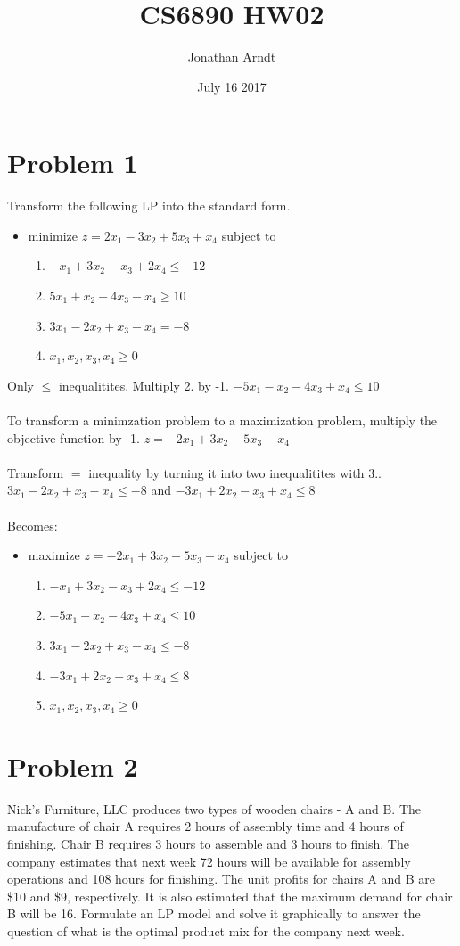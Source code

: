 \documentclass[11pt,a4paper,openany]{report}
\title{CS6890 HW02}
\author{Jonathan Arndt }
\date{July 16 2017}
\begin{document}
\maketitle

\section*{Problem 1}
Transform the following LP into the standard form.

\begin{itemize}
  \item minimize \(z=2x_1-3x_2+5x_3+x_4\) subject to
  \begin{enumerate}
    \item \(-x_1+3x_2-x_3+2x_4\leq-12\)
    \item \(5x_1+x_2+4x_3-x_4\geq10\)
    \item \(3x_1-2x_2+x_3-x_4=-8\)
    \item \(x_1,x_2,x_3,x_4\geq0\)
  \end{enumerate}
\end{itemize}
Only \(\leq\) inequalitites. Multiply 2. by -1. \(-5x_1-x_2-4x_3+x_4\leq10\)\\\\
To transform a minimzation problem to a maximization problem, multiply the objective function by -1. \(z=-2x_1+3x_2-5x_3-x_4\) \\\\
Transform \(=\) inequality by turning it into two inequalitites with 3..\\  \(3x_1-2x_2+x_3-x_4\leq-8\) and \(-3x_1+2x_2-x_3+x_4\leq8\)\\\\
Becomes:
\begin{itemize}
  \item maximize \(z=-2x_1+3x_2-5x_3-x_4\) subject to
  \begin{enumerate}
    \item \(-x_1+3x_2-x_3+2x_4\leq-12\)
    \item \(-5x_1-x_2-4x_3+x_4\leq10\)
    \item \(3x_1-2x_2+x_3-x_4\leq-8\)
    \item \(-3x_1+2x_2-x_3+x_4\leq8\)
    \item \(x_1,x_2,x_3,x_4\geq0\)
  \end{enumerate}
\end{itemize}

\newpage
\section*{Problem 2}
Nick’s Furniture, LLC produces two types of wooden chairs - A and B. The manufacture of chair A requires 2 hours of assembly time and 4 hours of finishing. Chair B requires 3 hours to assemble and 3 hours to finish. The company estimates that next week 72 hours will be available for assembly operations and 108 hours for finishing. The unit profits for chairs A and B are \$10 and \$9, respectively. It is also estimated that the maximum demand for chair B will be 16. Formulate an LP model and solve it graphically to answer the question of what is the optimal product mix for the company next week.\\
\end{document}

